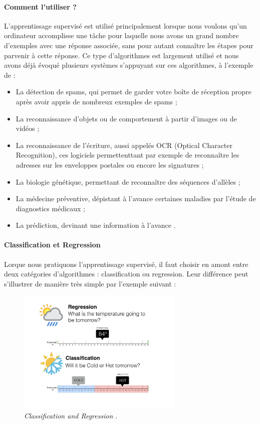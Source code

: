 \paragraph{Comment l'utiliser ?} L'apprentissage supervisé est utilisé principalement lorsque nous voulons qu'un ordinateur accomplisse une tâche pour laquelle nous avons un grand nombre
d'exemples avec une réponse associée, sans pour autant connaître les étapes pour parvenir à cette réponse. Ce type d'algorithmes est largement utilisé et nous avons déjà évoqué plusieurs
systèmes s'appuyant sur ces algorithmes, à l'exemple de :
\begin{itemize}
    \item La détection de spams, qui permet de garder votre boîte de réception propre après avoir appris de nombreux exemples de spams ;
    \item La reconnaissance d'objets ou de comportement à partir d'images ou de vidéos ;
    \item La reconnaissance de l'écriture, aussi appelés OCR (Optical Character Recognition), ces logiciels permettenttant par exemple de reconnaître les adresses sur les
    enveloppes postales ou encore les signatures ;
    \item La biologie génétique, permettant de reconnaître des séquences d'allèles ;
    \item La médecine préventive, dépistant à l'avance certaines maladies par l'étude de diagnostics médicaux ;
    \item La prédiction, devinant une information à l'avance \cite{MachineLearning2}.
\end{itemize}

\paragraph{Classification et Regression} Lorque nous pratiquons l'apprentissage supervisé, il faut choisir en amont entre deux catégories d'algorithmes : classification ou
regression. Leur différence peut s'illustrer de manière très simple par l'exemple suivant :

\begin{figure}[ht]
    \centering
    \includegraphics[width=300px]{chapters/03/images/classification-regression.jpg}
    \caption{\label{supervised learning}\emph{Classification and Regression} \cite{MachineLearning6}.}
\end{figure}

